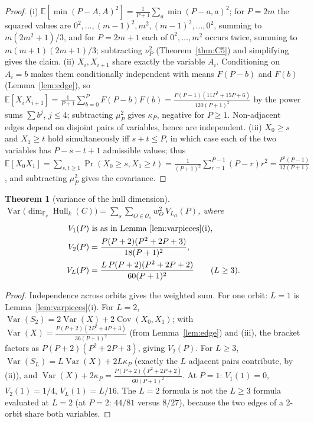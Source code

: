 \documentclass[11pt]{article}
\newtheorem{theorem}{Theorem}[section]
\theoremstyle{definition}
\theoremstyle{remark}
\newcommand{\Fq}{\mathbb{F}_q}
\newcommand{\Hull}{\operatorname{Hull}}
\newcommand{\E}{\mathbb{E}}
\begin{document}
\begin{proof}
(i) \(\E[\min(P-A,A)^2] = \frac{1}{P+1}\sum_a \min(P-a,a)^2\); for
\(P = 2m\) the squared values are \(0^2,\dots,(m-1)^2,m^2,(m-1)^2,\dots,0^2\),
summing to \(m(2m^2+1)/3\), and for \(P=2m+1\) each of \(0^2,\dots,m^2\)
occurs twice, summing to \(m(m+1)(2m+1)/3\); subtracting \(\nu_P^2\)
(Theorem~\ref{thm:C5}) and simplifying gives the claim.
(ii) \(X_i, X_{i+1}\) share exactly the variable \(A_i\). Conditioning on
\(A_i = b\) makes them conditionally independent with means
\(F(P-b)\) and \(F(b)\) (Lemma~\ref{lem:edge}), so
\(\E[X_iX_{i+1}] = \frac{1}{P+1}\sum_{b=0}^P F(P-b)F(b)
= \frac{P(P-1)(11P^2+15P+6)}{120(P+1)^2}\) by the power sums
\(\sum b^j\), \(j \le 4\); subtracting \(\mu_P^2\) gives \(\kappa_P\),
negative for \(P \ge 1\). Non-adjacent edges depend on disjoint pairs of
variables, hence are independent.
(iii) \(X_0 \ge s\) and \(X_1 \ge t\) hold simultaneously iff
\(s + t \le P\), in which case each of the two variables has
\(P-s-t+1\) admissible values; thus
\(\E[X_0X_1] = \sum_{s,t\ge1} \Pr(X_0\ge s, X_1\ge t)
= \frac{1}{(P+1)^2} \sum_{r=1}^{P-1} (P-r) r^2
= \frac{P^2(P-1)}{12(P+1)}\), and subtracting \(\mu_P^2\) gives the
covariance.
\end{proof}

\begin{theorem}[variance of the hull dimension]\label{thm:C6}
\(\displaystyle
\operatorname{Var}\big(\dim_{\Fq} \Hull_k(C)\big)
= \sum_{s} \sum_{O \in \mathcal{O}_s} w_O^2\, V_{L_O}(P)\), where
\[
\begin{aligned}
V_1(P) &\text{ is as in Lemma~\ref{lem:varpieces}(i)},\\
V_2(P) &= \frac{P(P+2)(P^2+2P+3)}{18(P+1)^2},\\
V_L(P) &= \frac{L\, P(P+2)(P^2+2P+2)}{60(P+1)^2} \qquad (L \ge 3).
\end{aligned}
\]
\end{theorem}

\begin{proof}
Independence across orbits gives the weighted sum. For one orbit:
\(L=1\) is Lemma~\ref{lem:varpieces}(i). For \(L=2\),
\(\operatorname{Var}(S_2) = 2\operatorname{Var}(X) + 2\operatorname{Cov}(X_0,X_1)\);
with \(\operatorname{Var}(X) = \frac{P(P+2)(2P^2+4P+3)}{36(P+1)^2}\)
(from Lemma~\ref{lem:edge}) and (iii), the bracket factors as
\(P(P+2)(P^2+2P+3)\), giving \(V_2(P)\). For \(L \ge 3\),
\(\operatorname{Var}(S_L) = L\operatorname{Var}(X) + 2L\kappa_P\) (exactly
the \(L\) adjacent pairs contribute, by (ii)), and
\(\operatorname{Var}(X) + 2\kappa_P =
\frac{P(P+2)(P^2+2P+2)}{60(P+1)^2}\). At \(P=1\): \(V_1(1) = 0\),
\(V_2(1) = 1/4\), \(V_L(1) = L/16\). The \(L=2\) formula is not the
\(L \ge 3\) formula evaluated at \(L=2\) (at \(P=2\): \(44/81\) versus
\(8/27\)), because the two edges of a 2-orbit share both variables.
\end{proof}
\end{document}
